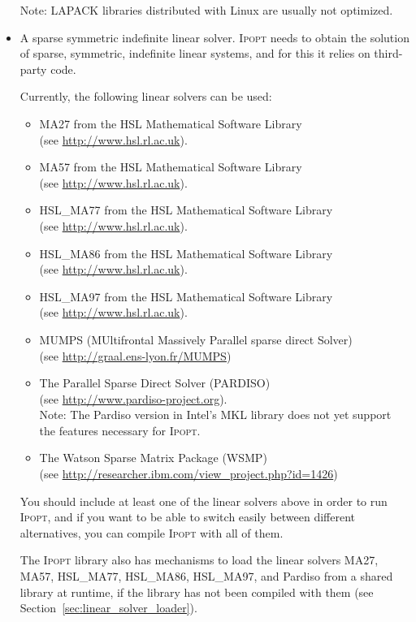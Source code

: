 \documentclass[10pt]{article}
\newcommand{\Ipopt}{\textsc{Ipopt}\xspace}
\begin{document}
\begin{itemize}
  Note: LAPACK libraries distributed with Linux are usually not
  optimized.
\item A sparse symmetric indefinite linear solver. \Ipopt needs
  to obtain the solution of sparse, symmetric, indefinite linear
  systems, and for this it relies on third-party code.  

  Currently, the following linear solvers can be used:
  \begin{itemize}
  \item MA27 from the HSL Mathematical Software Library\\ (see \url{http://www.hsl.rl.ac.uk}).
  \item MA57 from the HSL Mathematical Software Library\\ (see \url{http://www.hsl.rl.ac.uk}).
  \item HSL\_MA77 from the HSL Mathematical Software Library\\ (see \url{http://www.hsl.rl.ac.uk}).
  \item HSL\_MA86 from the HSL Mathematical Software Library\\ (see \url{http://www.hsl.rl.ac.uk}).
  \item HSL\_MA97 from the HSL Mathematical Software Library\\ (see \url{http://www.hsl.rl.ac.uk}).
  \item MUMPS (MUltifrontal Massively Parallel sparse direct Solver)\\
    (see \url{http://graal.ens-lyon.fr/MUMPS})
  \item The Parallel Sparse Direct Solver (PARDISO)\\ (see \url{http://www.pardiso-project.org}).\\
    Note: The Pardiso version in Intel's MKL library does not yet
    support the features necessary for \Ipopt.
  \item The Watson Sparse Matrix Package (WSMP)\\ (see \url{http://researcher.ibm.com/view_project.php?id=1426})
  \end{itemize}
  You should include at least one of the linear solvers above in order
  to run \Ipopt, and if you want to be able to switch easily between
  different alternatives, you can compile \Ipopt with all of them.

  The \Ipopt library also has mechanisms to load the linear solvers MA27, 
  MA57, HSL\_MA77, HSL\_MA86, HSL\_MA97, and Pardiso from a shared library at 
  runtime, if the library has not been compiled with them (see
  Section~\ref{sec:linear_solver_loader}).


\end{itemize}
\end{document}
